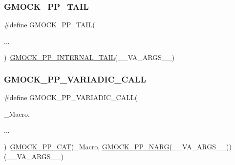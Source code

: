 \subsubsection{\texorpdfstring{GMOCK\_PP\_TAIL}{GMOCK\_PP\_TAIL}}
{\footnotesize\ttfamily \#define G\+M\+O\+C\+K\+\_\+\+P\+P\+\_\+\+T\+A\+IL(\begin{DoxyParamCaption}\item[{}]{... }\end{DoxyParamCaption})~\mbox{\hyperlink{_obj__test_2lib_2googletest-master_2googlemock_2include_2gmock_2internal_2gmock-pp_8h_a0e7741e9333e33780a56a8c5e2079942}{G\+M\+O\+C\+K\+\_\+\+P\+P\+\_\+\+I\+N\+T\+E\+R\+N\+A\+L\+\_\+\+T\+A\+IL}}(\+\_\+\+\_\+\+V\+A\+\_\+\+A\+R\+G\+S\+\_\+\+\_\+)}

\mbox{\label{_obj__test_2lib_2googletest-master_2googlemock_2include_2gmock_2internal_2gmock-pp_8h_a4dd8715f753c7c3957f7185acf609e55}} 
\subsubsection{\texorpdfstring{GMOCK\_PP\_VARIADIC\_CALL}{GMOCK\_PP\_VARIADIC\_CALL}}
{\footnotesize\ttfamily \#define G\+M\+O\+C\+K\+\_\+\+P\+P\+\_\+\+V\+A\+R\+I\+A\+D\+I\+C\+\_\+\+C\+A\+LL(\begin{DoxyParamCaption}\item[{}]{\+\_\+\+Macro,  }\item[{}]{... }\end{DoxyParamCaption})~\mbox{\hyperlink{_obj__test_2lib_2googletest-master_2googlemock_2include_2gmock_2internal_2gmock-pp_8h_a108c52ffa81ab99348d23b8fa76fded3}{G\+M\+O\+C\+K\+\_\+\+P\+P\+\_\+\+C\+AT}}(\+\_\+\+Macro, \mbox{\hyperlink{_obj__test_2lib_2googletest-master_2googlemock_2include_2gmock_2internal_2gmock-pp_8h_a9db18220b88597a07704bc7cf3b13304}{G\+M\+O\+C\+K\+\_\+\+P\+P\+\_\+\+N\+A\+RG}}(\+\_\+\+\_\+\+V\+A\+\_\+\+A\+R\+G\+S\+\_\+\+\_\+))(\+\_\+\+\_\+\+V\+A\+\_\+\+A\+R\+G\+S\+\_\+\+\_\+)}

